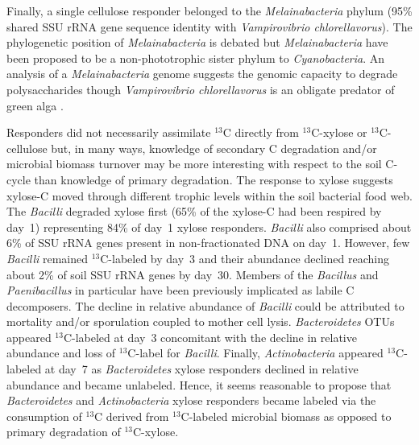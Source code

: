 Finally, a single cellulose responder belonged to the \textit{Melainabacteria}
phylum (95\% shared SSU rRNA gene sequence identity with \textit{Vampirovibrio
chlorellavorus}). The phylogenetic position of \textit{Melainabacteria} is
debated but \textit{Melainabacteria} have been proposed to be
a non-phototrophic sister phylum to \textit{Cyanobacteria}. An analysis of
a \textit{Melainabacteria} genome \citep{Di_Rienzi_2013} suggests the
genomic capacity to degrade polysaccharides though \textit{Vampirovibrio
chlorellavorus} is an obligate predator of green alga \citep{gromov_1972}.

Responders did not necessarily assimilate $^{13}$C directly
from $^{13}$C-xylose or $^{13}$C-cellulose but, in many ways, knowledge of
secondary C degradation and/or microbial biomass turnover may be more
interesting with respect to the soil C-cycle than knowledge of primary
degradation. The response to xylose suggests xylose-C moved through different
trophic levels within the soil bacterial food web. The \textit{Bacilli}
degraded xylose first (65\% of the xylose-C had been respired by day~1)
representing 84\% of day~1 xylose responders. \textit{Bacilli} also comprised
about 6\% of SSU rRNA genes present in non-fractionated DNA on day~1. However,
few \textit{Bacilli} remained $^{13}$C-labeled by day~3 and their abundance
declined reaching about 2\% of soil SSU rRNA genes by day~30. Members of the
\textit{Bacillus} \citep{Cleveland2007} and \textit{Paenibacillus} in
particular \citep{Verastegui_2014} have been previously implicated as labile
C decomposers. The decline in relative abundance of \textit{Bacilli} could be
attributed to mortality and/or sporulation coupled to mother cell lysis.
\textit{Bacteroidetes} OTUs appeared $^{13}$C-labeled at day~3 concomitant with
the decline in relative abundance and loss of $^{13}$C-label for
\textit{Bacilli}. Finally, \textit{Actinobacteria} appeared $^{13}$C-labeled at
day~7 as \textit{Bacteroidetes} xylose responders declined in relative
abundance and became unlabeled. Hence, it seems reasonable to propose that
\textit{Bacteroidetes} and \textit{Actinobacteria} xylose responders became
labeled via the consumption of $^{13}$C derived from $^{13}$C-labeled microbial
biomass as opposed to primary degradation of $^{13}$C-xylose. 

